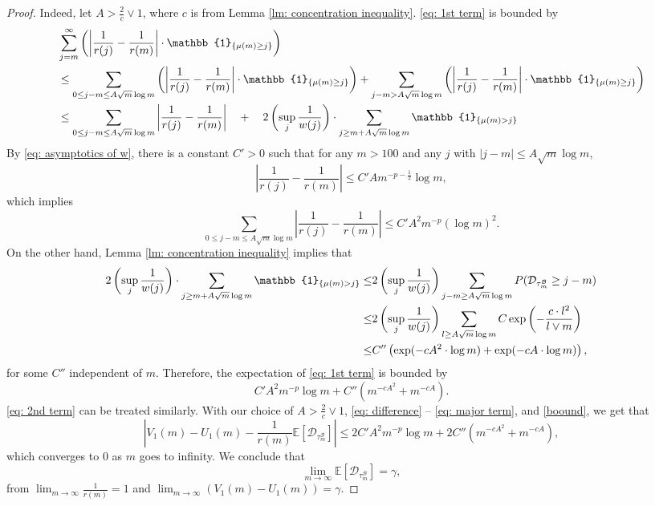 \documentclass[twoside,12pt, a4paper]{article}
\numberwithin{equation}{section}
\theoremstyle{remark}
\newcommand{\abs}[1]{\left\vert #1 \right\vert}
\begin{document}
\begin{proof}
		Indeed, let $A> \frac{2}{c} \vee 1$, where $c$ is from Lemma \ref{lm: concentration inequality}. \eqref{eq: 1st term} is bounded by
		\begin{align}
			& \sum_{j=m}^{\infty} \left(\abs{\frac{1}{r(j)} -\frac{1}{r(m)} } \cdot \mathbb{1}_{\left\{\mu(m)\geq j \right\}}\right)\\
			& \leq  \sum_{0\leq j-m \leq A \sqrt{m}\log m } \left(\abs{\frac{1}{r(j)} -\frac{1}{r(m)} } \cdot \mathbb{1}_{\left\{\mu(m)\geq j \right\}}\right)
			 +  \sum_{j-m > A\sqrt{m}\log m } \left(\abs{\frac{1}{r(j)} -\frac{1}{r(m)} } \cdot \mathbb{1}_{\left\{\mu(m)\geq j \right\}}\right)
			\notag
			\\
			&\leq  \sum_{0\leq j-m \leq A\sqrt{m}\log m } \abs{\frac{1}{r(j)} -\frac{1}{r(m)} }
			\quad +\quad 2\left(\sup_j \frac{1}{w(j)}\right) \cdot \sum_{j\geq m + A\sqrt{m}\log m } \mathbb{1}_{\left\{ \mu(m) > j \right\}}
			\label{low large difference}
		\end{align}
	 By \eqref{eq: asymptotics of w}, there is a constant $C'>0$ such that for any $m>100 $ and any $j$ with $\abs{j-m}\leq A \sqrt m \log m $, 
		$$ \abs{\frac{1}{r(j)} -\frac{1}{r(m)} } \leq C' A m^{-p-\frac{1}{2}} \log m, $$
		which implies
		\[
			\sum_{0\leq j-m \leq A\sqrt{m}\log m } \abs{\frac{1}{r(j)} -\frac{1}{r(m)} } \le 
		C' A^2 m^{-p} (\log m)^2.
		\] On the other hand, Lemma \ref{lm: concentration inequality} implies that
		\begin{align*}
2\left(\sup_j \frac{1}{w(j)}\right) \cdot \sum_{j\geq m + A\sqrt{m}\log m } \mathbb{1}_{\left\{ \mu(m) > j \right\}}
			\le & 2\left(\sup_j \frac{1}{w(j)}\right) \sum_{j-m \geq A \sqrt m \log m  } P( \mathcal{D}_{\tau^{\mathcal{B}}_m} \geq j-m )  
			\notag 
			\\
			\leq& 2\left(\sup_j \frac{1}{w(j)}\right) \sum_{l \geq A \sqrt m \log m } C \exp\left( - \frac{c  \cdot l^2}{l \vee m}   \right)
			\notag\\
			\leq& C'' \left( \exp (- cA^2 \cdot \log m ) + \exp(-cA \cdot \log m) \right), 
		\end{align*} for some $C''$ independent of $m$. Therefore, the expectation of \eqref{eq: 1st term} is bounded by
		\begin{equation}\label{boound}
			C' A^2 m^{-p} \log m + C''  \left( m ^{-cA^2} +  m^{-cA} \right). 
		\end{equation}
		\eqref{eq: 2nd term} can be treated similarly. With our choice of $A >\frac{2}{c} \vee 1$,
		\eqref{eq: difference} -- 
		\eqref{eq: major term}, and \eqref{boound}, we get that
		$$ \abs{ V_1(m)- U_1(m) -\frac{1}{r(m)}\mathbb{E}\left[ \mathcal{D}_{\tau^{\mathcal{B}}_m} \right] }
		\leq 2C' A^2 m^{-p} \log m + 2C''  \left( m ^{-cA^2} +  m^{-cA} \right), 
		$$ which converges to $0$ as $m$ goes to infinity. We conclude that 
		$$
		\lim_{m\to\infty}\mathbb{E}\left[ \mathcal{D}_{\tau^{\mathcal{B}}_m} \right] = \gamma, 
		$$ from $\lim_{m\to\infty}\frac{1}{r(m)} =1$ and $ \lim_{m\to \infty} \left(V_1(m)-U_1(m) \right) = \gamma$.
	\end{proof}
\end{document}
